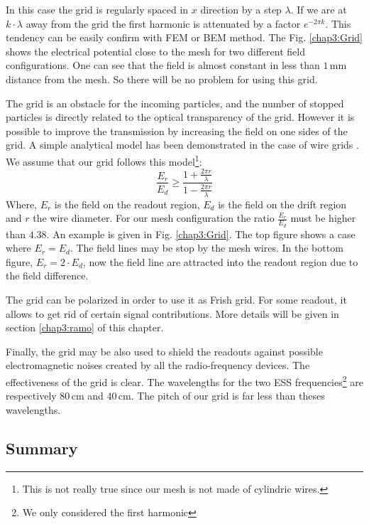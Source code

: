 \begin{refsection}
	In this case the grid is regularly spaced in $x$ direction by a step $\lambda$. If we are at $k \cdot \lambda$ away from the grid the first harmonic is attenuated by a factor $e^{-2\pi k}$. This tendency can be easily confirm with FEM or BEM method. The Fig. \ref{chap3:Grid} shows the electrical potential close to the mesh for two different field configurations. One can see that the field is almost constant in less than $1\,\mathrm{mm}$ distance from the mesh. So there will be no problem for using this grid.

	

	The grid is an obstacle for the incoming particles, and the number of stopped particles is directly related to the optical transparency of the grid. However it is possible to improve the transmission by increasing the field on one sides of the grid. A simple analytical model has been demonstrated in the case of wire grids \cite{Bunemann1949}. We assume that our grid follows this model\footnote{This is not really true since our mesh is not made of cylindric wires.}:
	\begin{equation}
		\frac{E_{r}}{E_{d}} \geq \frac{1+\frac{2 \pi r}{\lambda}}{1-\frac{2 \pi r}{\lambda}}
	\end{equation}
	Where, $E_{r}$ is the field on the readout region, $E_{d}$ is the field on the drift region and $r$ the wire diameter. For our mesh configuration the ratio $\frac{E_{r}}{E_{d}}$ must be higher than $4.38$.
	An example is given in Fig. \ref{chap3:Grid}. The top figure shows a case where $E_{r}=E_{d}$. The field lines may be stop by the mesh wires. In the bottom figure, $E_{r}=2 \cdot E_{d}$, now the field line are attracted into the readout region due to the field difference.

	The grid can be polarized in order to use it as Frish grid. For some readout, it allows to get rid of certain signal contributions. More details will be given in section \ref{chap3:ramo} of this chapter.

	Finally, the grid may be also used to shield the readouts against possible electromagnetic noises created by all the radio-frequency devices. The effectiveness of the grid is clear. The wavelengths for the two ESS frequencies\footnote{We only considered the first harmonic} are respectively $80\,\mathrm{cm}$ and $40\,\mathrm{cm}$. The pitch of our grid is far less than theses wavelengths.

	\subsection{Summary}


\end{refsection}
